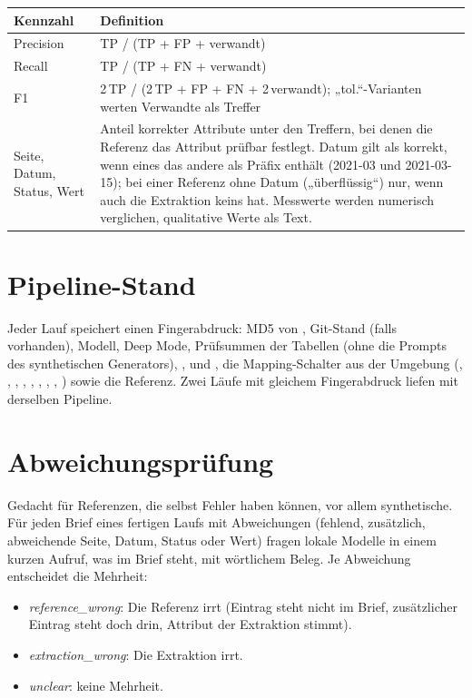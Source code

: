 \documentclass[11pt,a4paper,parskip=half-,headings=standardclasses,toc=bibliography,open=any]{scrreprt}
\begin{document}
\begin{tabularx}{\textwidth}{@{}P{4.0cm}L@{}}
\toprule
\textbf{Kennzahl} & \textbf{Definition}\\
\midrule
Precision & TP / (TP + FP + verwandt)\\
Recall & TP / (TP + FN + verwandt)\\
F1 & 2\,TP / (2\,TP + FP + FN + 2\,verwandt); „tol.“-Varianten werten Verwandte als Treffer\\
Seite, Datum, Status, Wert & Anteil korrekter Attribute unter den Treffern, bei denen die Referenz das Attribut prüfbar festlegt. Datum gilt als korrekt, wenn eines das andere als Präfix enthält (2021-03 und 2021-03-15); bei einer Referenz ohne Datum („überflüssig“) nur, wenn auch die Extraktion keins hat. Messwerte werden numerisch verglichen, qualitative Werte als Text.\\
\bottomrule
\end{tabularx}

\section{Pipeline-Stand}\label{sec:pipelinestand}

Jeder Lauf speichert einen Fingerabdruck: MD5 von , Git-Stand (falls vorhanden), Modell, Deep Mode, Prüfsummen der Tabellen  (ohne die Prompts des synthetischen Generators), ,  und , die Mapping-Schalter aus der Umgebung (, , , , , , , , ) sowie die Referenz. Zwei Läufe mit gleichem Fingerabdruck liefen mit derselben Pipeline.

\section{Abweichungsprüfung}\label{sec:abweichung}

Gedacht für Referenzen, die selbst Fehler haben können, vor allem synthetische. Für jeden Brief eines fertigen Laufs mit Abweichungen (fehlend, zusätzlich, abweichende Seite, Datum, Status oder Wert) fragen lokale Modelle in einem kurzen Aufruf, was im Brief steht, mit wörtlichem Beleg. Je Abweichung entscheidet die Mehrheit:

\begin{itemize}
  \item \emph{reference\_wrong}: Die Referenz irrt (Eintrag steht nicht im Brief, zusätzlicher Eintrag steht doch drin, Attribut der Extraktion stimmt).
  \item \emph{extraction\_wrong}: Die Extraktion irrt.
  \item \emph{unclear}: keine Mehrheit.
\end{itemize}
\end{document}
